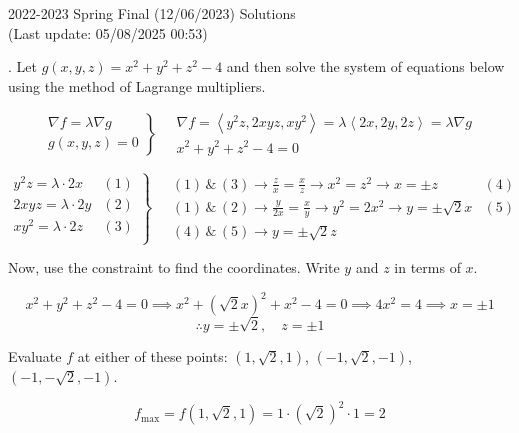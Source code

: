 \documentclass{article}
\begin{document}
\newpage

\begin{center}
2022-2023 Spring Final (12/06/2023) Solutions\\
(Last update: 05/08/2025 00:53)
\end{center}

. Let $g(x,y,z)=x^2+y^2+z^2-4$ and then solve the system of equations below using the method of Lagrange multipliers.

\[
\left.
\begin{array}{ll}
\displaystyle\nabla f =\lambda \nabla g \\
\displaystyle g(x,y,z) = 0
\end{array}
\right\}\quad
\begin{array}{ll}
\nabla f = \left\langle y^2z,2xyz,xy^2\right\rangle = \lambda\left\langle2x,2y,2z\right\rangle = \lambda\nabla g \\[0.2cm] x^2+y^2+z^2-4=0
\end{array}
\]

\[
\left.
\begin{array}{ll}
\displaystyle y^2z =\lambda \cdot2x & (1)\\[0.2cm]
\displaystyle 2xyz =\lambda \cdot2y & (2)\\[0.2cm]
\displaystyle xy^2 =\lambda \cdot2z & (3)\\[0.2cm]
\end{array}
\right\}\quad
\begin{array}{ll}
\displaystyle(1)\,\&\,(3)\rightarrow\frac{z}{x}=\frac{x}{z}\rightarrow x^2=z^2\rightarrow x=\pm z&(4)\\[0.4cm]
\displaystyle(1)\,\&\,(2)\rightarrow\frac{y}{2x}=\frac{x}{y}\rightarrow y^2=2x^2\rightarrow y=\pm\sqrt{2}x&(5)\\[0.4cm]\displaystyle(4)\,\&\,(5)\rightarrow y=\pm \sqrt 2z
\end{array}
\]

\hfill

\noindent Now, use the constraint to find the coordinates. Write $y$ and $z$ in terms of $x$.

\[x^2+y^2+z^2-4=0\implies x^2+\left(\sqrt2x\right)^2+x^2-4=0\implies4x^2=4\implies x=\pm1\]
\[\therefore y=\pm\sqrt2,\quad z=\pm1\]

\hfill

\noindent Evaluate $f$ at either of these points: $(1,\sqrt2,1)$, $(-1,\sqrt2,-1)$, $(-1,-\sqrt2,-1)$.

\[f_{\text{max}}=f(1,\sqrt2,1)=1\cdot\left(\sqrt2\right)^2\cdot1=\boxed{2}\]
\end{document}
